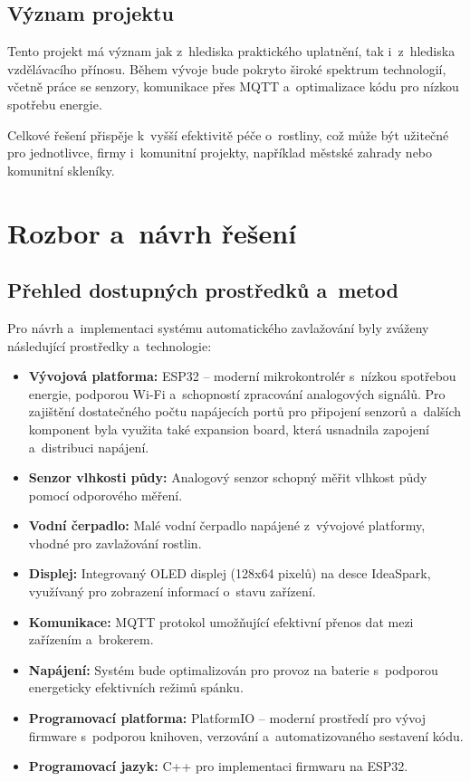 \documentclass[a4paper, 11pt]{article}
\begin{document}
\subsection{Význam projektu}
Tento projekt má význam jak z~hlediska praktického uplatnění, tak i~z~hlediska vzdělávacího přínosu. Během vývoje bude pokryto široké spektrum technologií, 
včetně práce se senzory, komunikace přes MQTT a~optimalizace kódu pro nízkou spotřebu energie.

Celkové řešení přispěje k~vyšší efektivitě péče o~rostliny, což může být užitečné pro jednotlivce, firmy i~komunitní projekty, například městské zahrady nebo komunitní skleníky.

\section{Rozbor a~návrh řešení}

\subsection{Přehled dostupných prostředků a~metod}

Pro návrh a~implementaci systému automatického zavlažování byly zváženy následující prostředky a~technologie:
\begin{itemize}
    \item \textbf{Vývojová platforma:} ESP32 – moderní mikrokontrolér s~nízkou spotřebou energie, podporou Wi-Fi a~schopností zpracování analogových signálů. Pro zajištění dostatečného počtu napájecích portů pro připojení senzorů a~dalších komponent byla využita také expansion board, která usnadnila zapojení a~distribuci napájení.
    \item \textbf{Senzor vlhkosti půdy:} Analogový senzor schopný měřit vlhkost půdy pomocí odporového měření.
    \item \textbf{Vodní čerpadlo:} Malé vodní čerpadlo napájené z~vývojové platformy, vhodné pro zavlažování rostlin.
    \item \textbf{Displej:} Integrovaný OLED displej (128x64 pixelů) na desce IdeaSpark, využívaný pro zobrazení informací o~stavu zařízení.
    \item \textbf{Komunikace:} MQTT protokol umožňující efektivní přenos dat mezi zařízením a~brokerem.
    \item \textbf{Napájení:} Systém bude optimalizován pro provoz na baterie s~podporou energeticky efektivních režimů spánku.
    \item \textbf{Programovací platforma:} PlatformIO – moderní prostředí pro vývoj firmware s~podporou knihoven, verzování a~automatizovaného sestavení kódu.
    \item \textbf{Programovací jazyk:} C++ pro implementaci firmwaru na ESP32.
\end{itemize}
\end{document}
